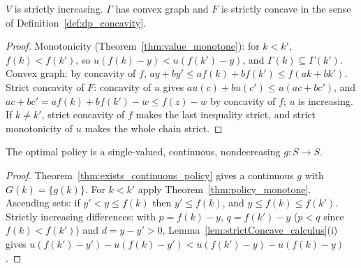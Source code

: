 \begin{theorem}
\label{thm:rck_value}
\leanok
{}
$V$ is strictly increasing. $\Gamma$ has convex graph and $F$ is strictly concave in the sense of
Definition~\ref{def:dp_concavity}.
\end{theorem}
\begin{proof}
\leanok
Monotonicity (Theorem~\ref{thm:value_monotone}): for $k < k'$, $f(k) < f(k')$, so $u(f(k) - y) < u(f(k') - y)$, and
$\Gamma(k) \subseteq \Gamma(k')$. Convex graph: by concavity of $f$, $a y + b y' \le a f(k) + b f(k') \le f(a k + b k')$.
Strict concavity of $F$: concavity of $u$ gives $a u(c) + b u(c') \le u(a c + b c')$, and
$a c + b c' = a f(k) + b f(k') - w \le f(z) - w$ by concavity of $f$; $u$ is increasing. If $k \neq k'$, strict concavity
of $f$ makes the last inequality strict, and strict monotonicity of $u$ makes the whole chain strict.
\end{proof}

\begin{theorem}
\label{thm:rck_monotone_policy}
\leanok
{}
The optimal policy is a single-valued, continuous, nondecreasing $g : S \to S$.
\end{theorem}
\begin{proof}
\leanok
Theorem~\ref{thm:exists_continuous_policy} gives a continuous $g$ with $G(k) = \{g(k)\}$. For $k < k'$ apply
Theorem~\ref{thm:policy_monotone}. Ascending sets: if $y' < y \le f(k)$ then $y' \le f(k)$, and $y \le f(k) \le f(k')$.
Strictly increasing differences: with $p = f(k) - y$, $q = f(k') - y$ ($p < q$ since $f(k) < f(k')$) and $d = y - y' > 0$,
Lemma~\ref{lem:strictConcave_calculus}(i) gives $u(f(k') - y') - u(f(k) - y') < u(f(k') - y) - u(f(k) - y)$.
\end{proof}

